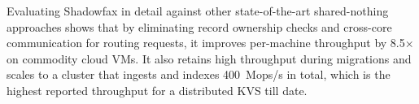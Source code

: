 Evaluating Shadowfax in detail against other state-of-the-art shared-nothing
approaches shows that by eliminating record ownership
checks and cross-core communication for routing requests, it improves
per-machine throughput by 8.5$\times$ on commodity cloud VMs.
%
It also retains high throughput during migrations and scales
to a
cluster that ingests and indexes 400~Mops/s in total,
%
which is the highest
reported throughput for a distributed KVS till date.
